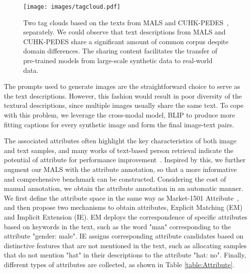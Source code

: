 \documentclass[sigconf]{acmart}
\begin{document}
\begin{figure*}[t]
\vspace{-.1in}
\begin{center}
     \texttt{[image: images/tagcloud.pdf]}     
\end{center}
\vspace{-.20in}
      \caption{Two tag clouds based on the texts from MALS  and CUHK-PEDES~\cite{li2017identity}, separately. We could observe that text descriptions from MALS and CUHK-PEDES share a significant amount of common corpus despite domain differences. The sharing content facilitates the transfer of pre-trained models from large-scale synthetic data to real-world data.
      }\label{fig:tag}
      \vspace{-.1in}
\end{figure*}


The prompts used to generate images are the straightforward choice to serve as the text descriptions.
However, this fashion would result in poor diversity of the textural descriptions, since multiple images usually share the same text. 
To cope with this problem, we leverage the cross-modal model, BLIP \cite{li2022blip} to produce more fitting captions for every synthetic image and form the final image-text pairs.


\vspace{-0.08cm}
The associated attributes often highlight the key characteristics of both image and text samples, and many works of text-based person retrieval indicate the potential of attribute for performance improvement~\cite{shu2023see, ding2021semantically, chen2022tipcb}. Inspired by this, we further augment our MALS with the attribute annotation, so that a more informative and comprehensive benchmark can be constructed. Considering the cost of manual annotation, we obtain the attribute annotation in an automatic manner.
We first define the attribute space in the same way as Market-1501 Attribute~\cite{lin2019improving}, and then propose two mechanisms to obtain attributes, Explicit Matching (EM) and Implicit Extension (IE). 
EM deploys the correspondence of specific attributes based on keywords in the text, such as the word "man" corresponding to the attribute "gender: male". 
IE assigns corresponding attribute candidates based on distinctive features that are not mentioned in the text, such as allocating samples that do not mention "hat" in their descriptions to the attribute "hat: no". 
Finally,  different types of attributes are collected, as shown in Table \ref{table:Attribute}.
\end{document}
